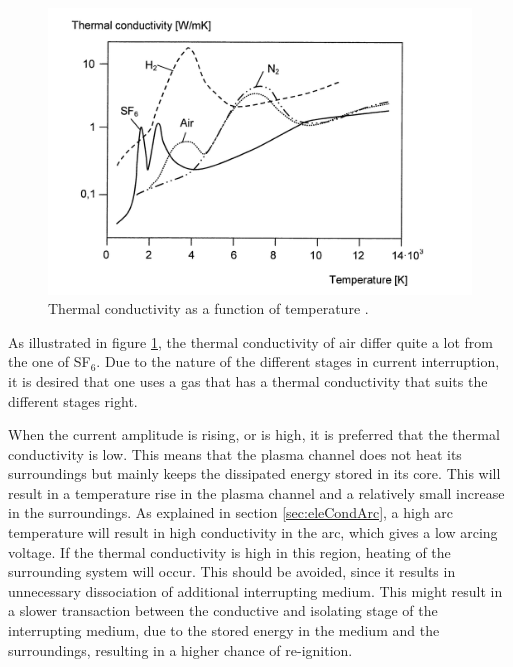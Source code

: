 \documentclass[10pt,a4paper,twoside]{article}
\begin{document}
\begin{figure}[H]
\centering
\includegraphics[scale=0.8]{Bilder/Theory/thermalCond.png}
\caption{Thermal conductivity as a function of temperature \cite{bib:HVEbreak}.} \label{fig:tempConGas}
\end{figure}

As illustrated in figure \ref{fig:tempConGas}, the thermal conductivity of air differ quite a lot from the one of SF$_6$. Due to the nature of the different stages in current interruption, it is desired that one uses a gas that has a thermal conductivity that suits the different stages right. 

When the current amplitude is rising, or is high, it is preferred that the thermal conductivity is low. This means that the plasma channel does not heat its surroundings but mainly keeps the dissipated energy stored in its core. This will result in a temperature rise in the plasma channel and a relatively small increase in the surroundings. As explained in section \ref{sec:eleCondArc}, a high arc temperature will result in high conductivity in the arc, which gives a low arcing voltage. If the thermal conductivity is high in this region, heating of the surrounding system will occur. This should be avoided, since it results in unnecessary dissociation of additional interrupting medium. This might result in a slower transaction between the conductive and isolating stage of the interrupting medium, due to the stored energy in the medium and the surroundings, resulting in a higher chance of re-ignition.
\end{document}
